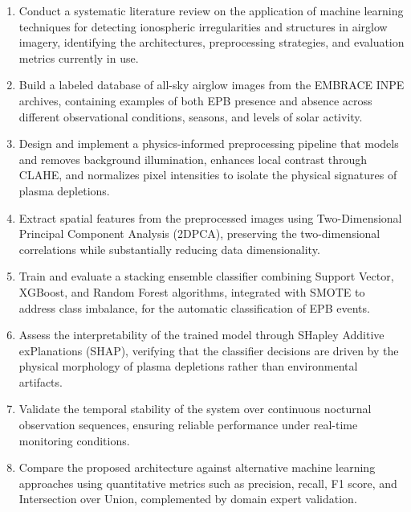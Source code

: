 \begin{enumerate}
    \item Conduct a systematic literature review on the application of machine learning techniques for detecting ionospheric irregularities and structures in airglow imagery, identifying the architectures, preprocessing strategies, and evaluation metrics currently in use.
    \item Build a labeled database of all-sky airglow images from the EMBRACE INPE archives, containing examples of both EPB presence and absence across different observational conditions, seasons, and levels of solar activity.
    \item Design and implement a physics-informed preprocessing pipeline that models and removes background illumination, enhances local contrast through CLAHE, and normalizes pixel intensities to isolate the physical signatures of plasma depletions.
    \item Extract spatial features from the preprocessed images using Two-Dimensional Principal Component Analysis (2DPCA), preserving the two-dimensional correlations while substantially reducing data dimensionality.
    \item Train and evaluate a stacking ensemble classifier combining Support Vector, XGBoost, and Random Forest algorithms, integrated with SMOTE to address class imbalance, for the automatic classification of EPB events.
    \item Assess the interpretability of the trained model through SHapley Additive exPlanations (SHAP), verifying that the classifier decisions are driven by the physical morphology of plasma depletions rather than environmental artifacts.
    \item Validate the temporal stability of the system over continuous nocturnal observation sequences, ensuring reliable performance under real-time monitoring conditions.
    \item Compare the proposed architecture against alternative machine learning approaches using quantitative metrics such as precision, recall, F1 score, and Intersection over Union, complemented by domain expert validation.
\end{enumerate}